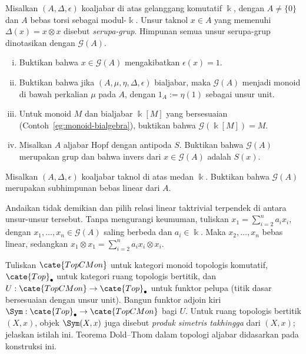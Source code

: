 	\item Misalkan $(A,\Delta,\epsilon)$ koaljabar di atas gelanggang komutatif
	$\Bbbk$, dengan $A\neq\{0\}$ dan $A$ bebas torsi sebagai modul-$\Bbbk$.
	Unsur taknol $x\in A$ yang memenuhi $\Delta(x)=x\otimes x$ disebut
	\emph{serupa-grup}. Himpunan semua unsur serupa-grup dinotasikan dengan
	$\mathcal{G}(A)$.
	\begin{enumerate}[(i)]
		\item Buktikan bahwa $x\in\mathcal{G}(A)$ mengakibatkan
		$\epsilon(x)=1$.
		\item Buktikan bahwa jika $(A,\mu,\eta,\Delta,\epsilon)$ bialjabar, maka
		$\mathcal{G}(A)$ menjadi monoid di bawah perkalian $\mu$ pada $A$, dengan
		$1_A:=\eta(1)$ sebagai unsur unit.
		\item Untuk monoid $M$ dan bialjabar $\Bbbk[M]$ yang bersesuaian
		(Contoh~\ref{eg:monoid-bialgebra}), buktikan bahwa
		$\mathcal{G}(\Bbbk[M])=M$.
		\item Misalkan $A$ aljabar Hopf dengan antipoda $S$. Buktikan bahwa
		$\mathcal{G}(A)$ merupakan grup dan bahwa invers dari
		$x\in\mathcal{G}(A)$ adalah $S(x)$.
	\end{enumerate}

	\item Misalkan $(A,\Delta,\epsilon)$ koaljabar taknol di atas medan
	$\Bbbk$. Buktikan bahwa $\mathcal{G}(A)$ merupakan subhimpunan bebas linear
	dari $A$.

	\begin{hint}
		Andaikan tidak demikian dan pilih relasi linear taktrivial terpendek di
		antara unsur-unsur tersebut. Tanpa mengurangi keumuman, tuliskan
		$x_1=\sum_{i=2}^n a_i x_i$, dengan
		$x_1,\ldots,x_n\in\mathcal{G}(A)$ saling berbeda dan $a_i\in\Bbbk$.
		Maka $x_2,\ldots,x_n$ bebas linear, sedangkan
		$x_1\otimes x_1=\sum_{i=2}^n a_i x_i\otimes x_i$.
	\end{hint}

	\item Tuliskan $\cate{TopCMon}$ untuk kategori monoid topologis komutatif,
	$\cate{Top}_\bullet$ untuk kategori ruang topologis bertitik, dan
	$U:\cate{TopCMon}\to\cate{Top}_\bullet$ untuk funktor pelupa (titik
	dasar bersesuaian dengan unsur unit). Bangun funktor adjoin kiri
	$\Sym:\cate{Top}_\bullet\to\cate{TopCMon}$ bagi $U$. Untuk ruang topologis
	bertitik $(X,x)$, objek $\Sym(X,x)$ juga disebut \emph{produk simetris
	takhingga} dari $(X,x)$; jelaskan istilah ini. Teorema Dold--Thom dalam
	topologi aljabar didasarkan pada konstruksi ini.

